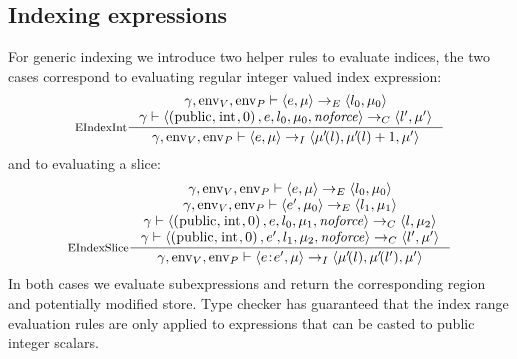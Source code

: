 \documentclass[a4paper, 10pt, draft]{report}
\DeclareMathOperator*{\env}{env}
\DeclareMathOperator*{\noforce}{\mathit{noforce}}
\newcommand{\mycode}[1]{\ensuremath{\mbox{\lstinline{#1}}}}
\begin{document}
\subsection{Indexing expressions}\label{sec:semantics:exp:index}

For generic indexing we introduce two helper rules to evaluate indices, the two
cases correspond to evaluating regular integer valued index expression:
\[ \inference[EIndexInt]
{
  \gamma, \env_V, \env_P |- \left< e, \mu \right> \to_E \left< l_0, \mu_0 \right> \\
  \gamma |- \left< \left( \mycode{public}, \mycode{int}, 0 \right), e, l_0, \mu_0, \noforce \right> \to_C \left< l', \mu' \right>
}{
  \gamma, \env_V, \env_P |- \left< e, \mu \right> \to_I \left< \mu'\!(l), \mu'\!(l) + 1, \mu' \right>
} \]
and to evaluating a slice:
\[ \inference[EIndexSlice]
{
  \gamma, \env_V, \env_P |- \left< e, \mu \right> \to_E \left< l_0, \mu_0\right> \\
  \gamma, \env_V, \env_P |- \left< e', \mu_0 \right> \to_E \left< l_1, \mu_1\right> \\
  \gamma |- \left< \left( \mycode{public}, \mycode{int}, 0 \right), e, l_0, \mu_1, \noforce \right> \to_C \left< l, \mu_2 \right> \\
  \gamma |- \left< \left( \mycode{public}, \mycode{int}, 0 \right), e', l_1, \mu_2, \noforce \right> \to_C \left< l', \mu' \right>
}{
  \gamma, \env_V, \env_P |- \left< e\mycode{:}e', \mu \right> \to_I \left< \mu'\!(l), \mu'\!(l'), \mu' \right>
} \]
In both cases we evaluate subexpressions and return the corresponding region
and potentially modified store. Type checker has guaranteed that the index
range evaluation rules are only applied to expressions that can be casted to
public integer scalars.
\end{document}
